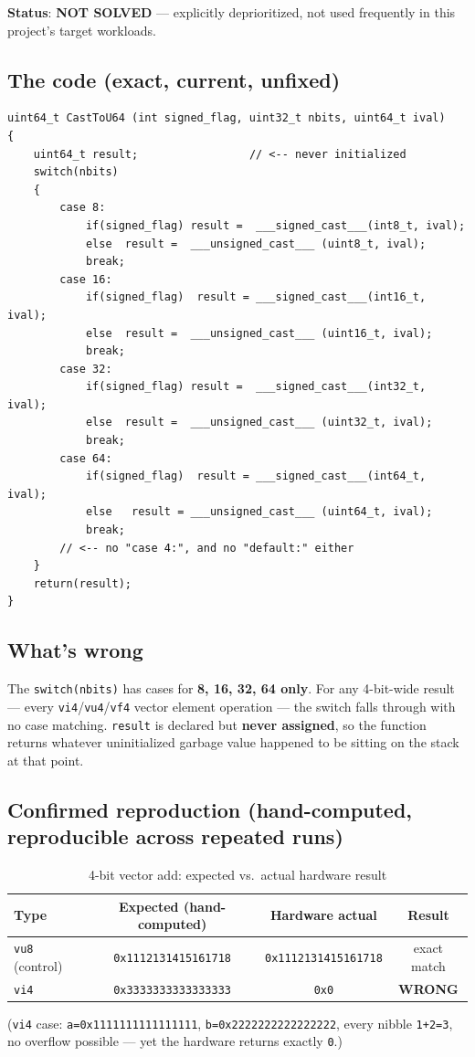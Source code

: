 \documentclass[11pt,a4paper]{report}
\begin{document}
\textbf{Status}: \textbf{NOT SOLVED} --- explicitly deprioritized, not used frequently in
this project's target workloads.

\subsection*{The code (exact, current, unfixed)}
\begin{lstlisting}[caption={\texttt{McodeOperations.cpp}, lines 50--74 --- \texttt{CastToU64}}]
uint64_t CastToU64 (int signed_flag, uint32_t nbits, uint64_t ival)
{
    uint64_t result;                 // <-- never initialized
    switch(nbits)
    {
        case 8:
            if(signed_flag) result =  ___signed_cast___(int8_t, ival);
            else  result =  ___unsigned_cast___ (uint8_t, ival);
            break;
        case 16:
            if(signed_flag)  result = ___signed_cast___(int16_t, ival);
            else  result =  ___unsigned_cast___ (uint16_t, ival);
            break;
        case 32:
            if(signed_flag) result =  ___signed_cast___(int32_t, ival);
            else  result =  ___unsigned_cast___ (uint32_t, ival);
            break;
        case 64:
            if(signed_flag)  result = ___signed_cast___(int64_t, ival);
            else   result = ___unsigned_cast___ (uint64_t, ival);
            break;
        // <-- no "case 4:", and no "default:" either
    }
    return(result);
}
\end{lstlisting}

\subsection*{What's wrong}
The \texttt{switch(nbits)} has cases for \textbf{8, 16, 32, 64 only}. For any 4-bit-wide
result --- every \texttt{vi4}/\texttt{vu4}/\texttt{vf4} vector element operation --- the
switch falls through with no case matching. \texttt{result} is declared but \textbf{never
assigned}, so the function returns whatever uninitialized garbage value happened to be
sitting on the stack at that point.

\subsection*{Confirmed reproduction (hand-computed, reproducible across repeated runs)}
\begin{table}[h]
\centering
\caption{4-bit vector add: expected vs.\ actual hardware result}
\begin{tabular}{@{}lccc@{}}
\toprule
Type & Expected (hand-computed) & Hardware actual & Result \\
\midrule
\texttt{vu8} (control) & \texttt{0x1112131415161718} & \texttt{0x1112131415161718} & exact match \\
\texttt{vi4} & \texttt{0x3333333333333333} & \texttt{0x0} & \textbf{WRONG} \\
\bottomrule
\end{tabular}
\end{table}
(\texttt{vi4} case: \texttt{a=0x1111111111111111}, \texttt{b=0x2222222222222222}, every
nibble \texttt{1+2=3}, no overflow possible --- yet the hardware returns exactly \texttt{0}.)
\end{document}
